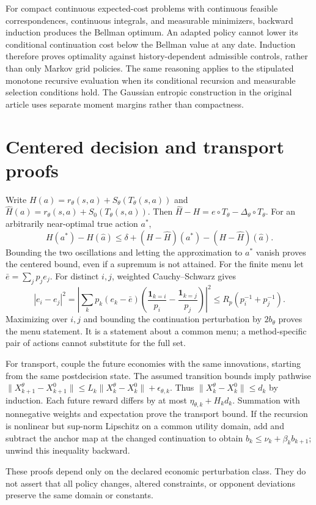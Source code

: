 \documentclass[ecta,nameyear,draft]{econsocart}
\begin{document}
For compact continuous expected-cost problems with continuous feasible correspondences, continuous integrals, and measurable minimizers, backward induction produces the Bellman optimum. An adapted policy cannot lower its conditional continuation cost below the Bellman value at any date. Induction therefore proves optimality against history-dependent admissible controls, rather than only Markov grid policies. The same reasoning applies to the stipulated monotone recursive evaluation when its conditional recursion and measurable selection conditions hold. The Gaussian entropic construction in the original article uses separate moment margins rather than compactness.

\section{Centered decision and transport proofs}
Write $H(a)=r_\theta(s,a)+S_\theta(T_\theta(s,a))$ and
$\widehat H(a)=r_\theta(s,a)+\widehat S_0(T_\theta(s,a))$.
Then $\widehat H-H=e\circ T_\theta-\Delta_\theta\circ T_\theta$.
For an arbitrarily near-optimal true action $a^*$,
\[
 H(a^*)-H(\widehat a)
 \leq\delta+(H-\widehat H)(a^*)-(H-\widehat H)(\widehat a).
\]
Bounding the two oscillations and letting the approximation to $a^*$ vanish proves the centered bound, even if a supremum is not attained. For the finite menu let $\bar e=\sum_jp_je_j$. For distinct $i,j$, weighted Cauchy--Schwarz gives
\[
 |e_i-e_j|^2
 =\left|\sum_kp_k(e_k-\bar e)
       \left(\frac{\mathbf1_{k=i}}{p_i}-\frac{\mathbf1_{k=j}}{p_j}\right)\right|^2
 \leq R_p(p_i^{-1}+p_j^{-1}).
\]
Maximizing over $i,j$ and bounding the continuation perturbation by $2b_\theta$ proves the menu statement. It is a statement about a common menu; a method-specific pair of actions cannot substitute for the full set.

For transport, couple the future economies with the same innovations, starting from the same postdecision state. The assumed transition bounds imply pathwise
$\|X_{k+1}^\theta-X_{k+1}^0\|\leq L_k\|X_k^\theta-X_k^0\|+\epsilon_{\theta,k}$.
Thus $\|X_k^\theta-X_k^0\|\leq d_k$ by induction. Each future reward differs by at most $\eta_{\theta,k}+H_kd_k$. Summation with nonnegative weights and expectation prove the transport bound. If the recursion is nonlinear but sup-norm Lipschitz on a common utility domain, add and subtract the anchor map at the changed continuation to obtain $b_k\leq\nu_k+\beta_kb_{k+1}$; unwind this inequality backward.

These proofs depend only on the declared economic perturbation class. They do not assert that all policy changes, altered constraints, or opponent deviations preserve the same domain or constants.
\end{document}
